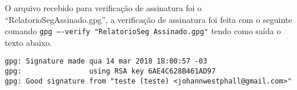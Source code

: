 \documentclass[
    article,            %
    11pt,               %
    oneside,            %
    a4paper,            %
    english,            %
    brazil,             %
    sumario=tradicional,
    ]{abntex2}
\begin{document}
O arquivo recebido para verificação de assinatura foi o ``RelatorioSegAssinado.gpg'', a verificação de assinatura foi feita com o seguinte comando \texttt{gpg ----verify "RelatorioSeg
Assinado.gpg"} tendo como saída o texto abaixo.

\begin{Verbatim}[frame=single, commandchars=\\\{\}, fontsize=\footnotesize]
gpg: Signature made qua 14 mar 2018 18:00:57 -03
gpg:                using RSA key 6AE4C628B461AD97
gpg: Good signature from "teste (teste) <johannwestphall@gmail.com>"
\end{Verbatim}


% 


\postextual

\nocite{GnuPrivacyGuardHowto}
\nocite{subkeys_debian}

\end{document}
